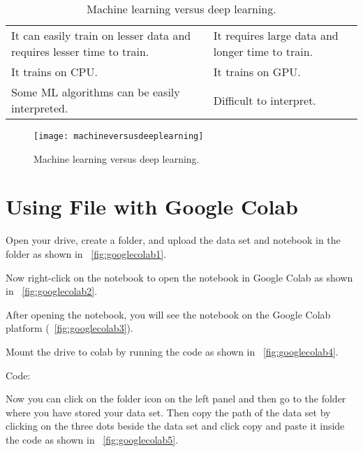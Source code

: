 	\begin{table}
        \centering
        \caption[Machine learning versus deep learning]{Machine learning versus deep learning.}
        \label{tab:machineversusdeeplearning}
		\begin{tabular}{|p{0.5\qandatextwidth-2\tabcolsep}|p{0.5\qandatextwidth-2\tabcolsep}|} \hline
				\tablecolumnheadervlinesone{Machine Learning} & \tablecolumnheadervlinestwo{Deep Learning} \\ \hline
				It can easily train on lesser data and requires lesser time to train. &
				It requires large data and longer time to train. \\ \hline
				It trains on CPU. &
				It trains on GPU. \\ \hline
				Some ML algorithms can be easily interpreted. &
				Difficult to interpret. \\ \hline%
		\end{tabular}
	\end{table}

	\begin{figure}[h]
		\centering
		\texttt{[image: machineversusdeeplearning]}
		\caption[Machine learning versus deep learning]{Machine learning versus deep learning.}
		\label{fig:machineversusdeeplearning}
	\end{figure}


	\section{Using File with Google Colab}

	\begin{numberedlist}
		\item Open your drive, create a folder, and upload the data set and notebook in the folder as shown in \figurename~\ref{fig:googlecolab1}.
		\item Now right-click on the notebook to open the notebook in Google Colab as shown in \figurename~\ref{fig:googlecolab2}.
		\item After opening the notebook, you will see the notebook on the Google Colab platform (\figurename~\ref{fig:googlecolab3}).
		\item Mount the drive to colab by running the code as shown in \figurename~\ref{fig:googlecolab4}.
		\item Code:
		\begin{plainlist}
			\item {}
			\item {}
		\end{plainlist}
		\item Now you can click on the folder icon on the left panel and then go to the folder where you have stored your data set. Then copy the path of the data set by clicking on the three dots beside the data set and click copy and paste it inside the code as shown in \figurename~\ref{fig:googlecolab5}.
	\end{numberedlist}

